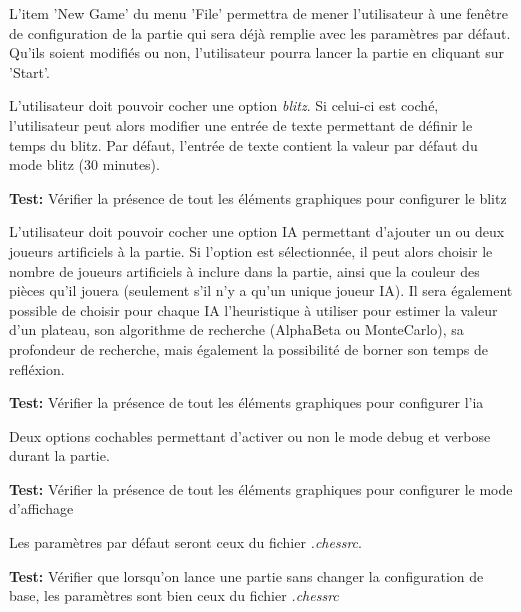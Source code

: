 \documentclass{article}
\begin{document}
\begin{needbox}
    L'item 'New Game' du menu 'File' permettra de mener l'utilisateur à une fenêtre de configuration
    de la partie qui sera déjà remplie avec les paramètres par défaut. Qu'ils soient modifiés ou
    non, l'utilisateur pourra lancer la partie en cliquant sur 'Start'. 
    \begin{subneedbox}
        L'utilisateur doit pouvoir cocher une option \textit{blitz}.
        Si celui-ci est coché, l'utilisateur peut alors modifier une entrée
        de texte permettant de définir le temps du blitz. Par défaut, l'entrée de texte
        contient la valeur par défaut du mode blitz (30 minutes).

        \textbf{Test:} Vérifier la présence de tout les éléments graphiques pour configurer le blitz
    \end{subneedbox}
    \begin{subneedbox}
        L'utilisateur doit pouvoir cocher une option IA permettant d'ajouter
        un ou deux joueurs artificiels à la partie. Si l'option est sélectionnée,
        il peut alors choisir le nombre de joueurs artificiels à inclure dans la partie,
        ainsi que la couleur des pièces qu'il jouera (seulement s'il n'y a qu'un unique
        joueur IA).
        Il sera également possible de choisir pour chaque IA l'heuristique à utiliser pour
        estimer la valeur d'un plateau, son algorithme de recherche (AlphaBeta ou MonteCarlo),
        sa profondeur de recherche, mais également la possibilité de borner son temps de refléxion.

        \textbf{Test:} Vérifier la présence de tout les éléments graphiques pour configurer l'ia
    \end{subneedbox}
    \begin{subneedbox}
        Deux options cochables permettant d'activer ou non le mode debug et verbose
        durant la partie.

        \textbf{Test:} Vérifier la présence de tout les éléments graphiques pour configurer le mode d'affichage
    \end{subneedbox}
    \begin{subneedbox}
        Les paramètres par défaut seront ceux du fichier \textit{.chessrc}.

        \textbf{Test:} Vérifier que lorsqu'on lance une partie sans changer la configuration de base,
        les paramètres sont bien ceux du fichier \textit{.chessrc}
    \end{subneedbox}

\end{needbox}
\end{document}
